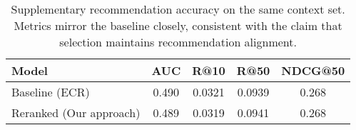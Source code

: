 \documentclass[12pt]{article}
\begin{document}
  \begin{table}[h]
  \centering
  \begin{tabular}{lcccc}
  \toprule
  Model & AUC & R@10 & R@50 & NDCG@50 \\
  \midrule
  Baseline (ECR) & 0.490 & 0.0321 & 0.0939 & 0.268 \\
  Reranked (Our approach) & 0.489 & 0.0319 & 0.0941 & 0.268 \\
  \bottomrule
  \end{tabular}
  \caption{Supplementary recommendation accuracy on the same context set. Metrics mirror the baseline closely, consistent with the claim that selection maintains recommendation alignment.}
  \label{tab:appendix_rec}
  \end{table}
  
  
\end{document}
